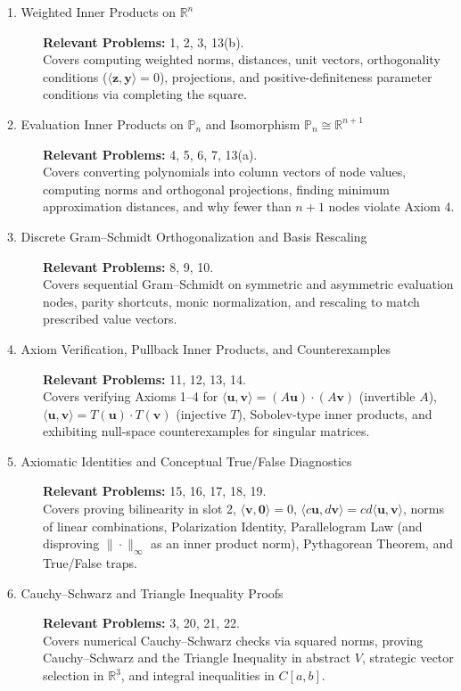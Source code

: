 \documentclass[11pt, letterpaper]{article}
\theoremstyle{definition}
\theoremstyle{remark}
\begin{document}
\begin{description}
    \item[{1. Weighted Inner Products on $\mathbb{R}^n$}]
    \textbf{Relevant Problems:} 1, 2, 3, 13(b).\\
    Covers computing weighted norms, distances, unit vectors, orthogonality conditions ($\langle \mathbf{z}, \mathbf{y} \rangle = 0$), projections, and positive-definiteness parameter conditions via completing the square.

    \item[{2. Evaluation Inner Products on $\mathbb{P}_n$ and Isomorphism $\mathbb{P}_n \cong \mathbb{R}^{n+1}$}]
    \textbf{Relevant Problems:} 4, 5, 6, 7, 13(a).\\
    Covers converting polynomials into column vectors of node values, computing norms and orthogonal projections, finding minimum approximation distances, and why fewer than $n+1$ nodes violate Axiom 4.

    \item[{3. Discrete Gram--Schmidt Orthogonalization and Basis Rescaling}]
    \textbf{Relevant Problems:} 8, 9, 10.\\
    Covers sequential Gram--Schmidt on symmetric and asymmetric evaluation nodes, parity shortcuts, monic normalization, and rescaling to match prescribed value vectors.

    \item[{4. Axiom Verification, Pullback Inner Products, and Counterexamples}]
    \textbf{Relevant Problems:} 11, 12, 13, 14.\\
    Covers verifying Axioms 1--4 for $\langle \mathbf{u}, \mathbf{v} \rangle = (A\mathbf{u})\cdot(A\mathbf{v})$ (invertible $A$), $\langle \mathbf{u}, \mathbf{v} \rangle = T(\mathbf{u})\cdot T(\mathbf{v})$ (injective $T$), Sobolev-type inner products, and exhibiting null-space counterexamples for singular matrices.

    \item[{5. Axiomatic Identities and Conceptual True/False Diagnostics}]
    \textbf{Relevant Problems:} 15, 16, 17, 18, 19.\\
    Covers proving bilinearity in slot 2, $\langle \mathbf{v}, \mathbf{0} \rangle = 0$, $\langle c\mathbf{u}, d\mathbf{v} \rangle = cd\langle \mathbf{u}, \mathbf{v} \rangle$, norms of linear combinations, Polarization Identity, Parallelogram Law (and disproving $\|\cdot\|_\infty$ as an inner product norm), Pythagorean Theorem, and True/False traps.

    \item[{6. Cauchy--Schwarz and Triangle Inequality Proofs}]
    \textbf{Relevant Problems:} 3, 20, 21, 22.\\
    Covers numerical Cauchy--Schwarz checks via squared norms, proving Cauchy--Schwarz and the Triangle Inequality in abstract $V$, strategic vector selection in $\mathbb{R}^3$, and integral inequalities in $C[a, b]$.


\end{description}
\end{document}
